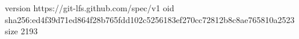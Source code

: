 version https://git-lfs.github.com/spec/v1
oid sha256:ed4f39d71ed864f28b765fdd102c5256183ef270cc72812b8c8ae765810a2523
size 2193
